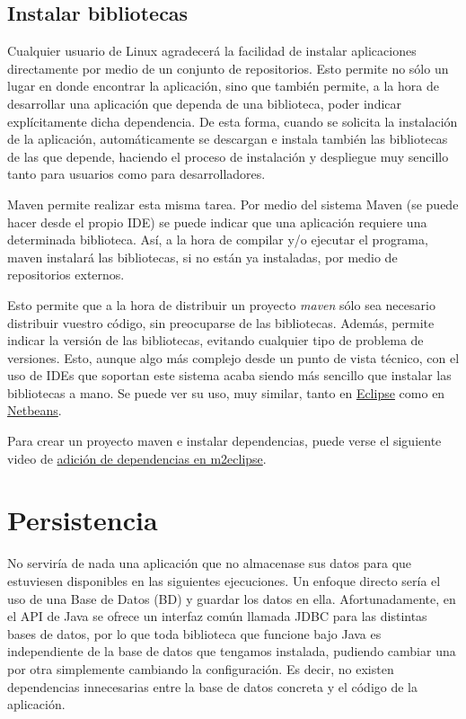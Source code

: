 \documentclass[11pt]{article}
\begin{document}
\subsection{Instalar bibliotecas} \label{sec-5-2}

Cualquier usuario de Linux agradecerá la facilidad de instalar aplicaciones
directamente por medio de un conjunto de repositorios. Esto permite no sólo un
lugar en donde encontrar la aplicación, sino que también permite, a la hora de
desarrollar una aplicación que dependa de una biblioteca, poder indicar explícitamente dicha
dependencia. De esta forma, cuando se solicita la instalación de la aplicación,
automáticamente se descargan e instala también las bibliotecas de las que
depende, haciendo el proceso de instalación y despliegue muy sencillo tanto para usuarios
como para desarrolladores.

Maven permite realizar esta misma tarea. Por medio del sistema Maven (se puede
hacer desde el propio IDE) se puede indicar que una aplicación requiere una
determinada biblioteca. Así, a la hora de compilar y/o ejecutar el programa,
maven instalará las bibliotecas, si no están ya instaladas, por medio de
repositorios externos.

Esto permite que a la hora de distribuir un proyecto \emph{maven} sólo sea
necesario distribuir vuestro código, sin preocuparse de las bibliotecas. Además, permite indicar la versión de las bibliotecas, evitando cualquier tipo de problema de versiones. Esto, aunque algo más complejo desde un punto de vista técnico, con el uso de IDEs que soportan este sistema acaba
siendo más sencillo que instalar las bibliotecas a mano. Se puede ver su uso, muy similar, tanto en
\href{http://m2eclipse.sonatype.org/adding-project-dependencies-in-m2eclipse.html}{Eclipse}
como en \href{http://wiki.netbeans.org/MavenBestPractices}{Netbeans}. 

Para crear un proyecto maven e instalar dependencias, puede verse el siguiente video de
\href{http://www.youtube.com/watch?v=IRKu8_l5YiQ}{adición de dependencias en m2eclipse}.

\section{Persistencia} \label{sec-6}
\label{librerias}

No serviría de nada una aplicación que no almacenase sus datos para que
estuviesen disponibles en las siguientes ejecuciones. Un enfoque directo sería el uso de una Base de Datos (BD) y guardar los datos
en ella. Afortunadamente, en el API de Java se ofrece un interfaz común llamada JDBC para
las distintas bases de datos, por lo que toda biblioteca que funcione bajo Java
es independiente de la base de datos que tengamos instalada, pudiendo cambiar
una por otra simplemente cambiando la configuración. Es decir, no existen
dependencias innecesarias entre la base de datos concreta y el código de la
aplicación.
\end{document}
